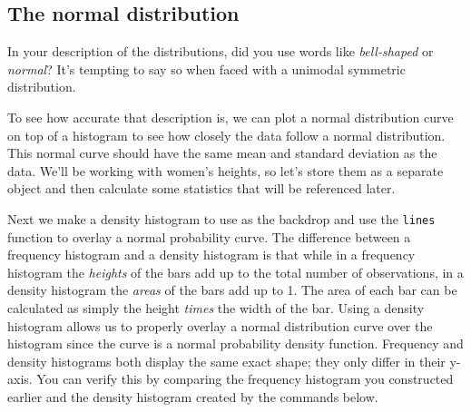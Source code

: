 \documentclass[]{article}
\newenvironment{Shaded}{\begin{snugshade}}{\end{snugshade}}
\newcommand{\KeywordTok}[1]{\textcolor[rgb]{0.13,0.29,0.53}{\textbf{{#1}}}}
\newcommand{\DataTypeTok}[1]{\textcolor[rgb]{0.13,0.29,0.53}{{#1}}}
\newcommand{\DecValTok}[1]{\textcolor[rgb]{0.00,0.00,0.81}{{#1}}}
\newcommand{\StringTok}[1]{\textcolor[rgb]{0.31,0.60,0.02}{{#1}}}
\newcommand{\OtherTok}[1]{\textcolor[rgb]{0.56,0.35,0.01}{{#1}}}
\newcommand{\NormalTok}[1]{{#1}}
\begin{document}
\subsection{The normal distribution}\label{the-normal-distribution}

In your description of the distributions, did you use words like
\emph{bell-shaped} or \emph{normal}? It's tempting to say so when faced
with a unimodal symmetric distribution.

To see how accurate that description is, we can plot a normal
distribution curve on top of a histogram to see how closely the data
follow a normal distribution. This normal curve should have the same
mean and standard deviation as the data. We'll be working with women's
heights, so let's store them as a separate object and then calculate
some statistics that will be referenced later.

\begin{Shaded}
\end{Shaded}

Next we make a density histogram to use as the backdrop and use the
\texttt{lines} function to overlay a normal probability curve. The
difference between a frequency histogram and a density histogram is that
while in a frequency histogram the \emph{heights} of the bars add up to
the total number of observations, in a density histogram the
\emph{areas} of the bars add up to 1. The area of each bar can be
calculated as simply the height \emph{times} the width of the bar. Using
a density histogram allows us to properly overlay a normal distribution
curve over the histogram since the curve is a normal probability density
function. Frequency and density histograms both display the same exact
shape; they only differ in their y-axis. You can verify this by
comparing the frequency histogram you constructed earlier and the
density histogram created by the commands below.

\begin{Shaded}
\end{Shaded}
\end{document}
